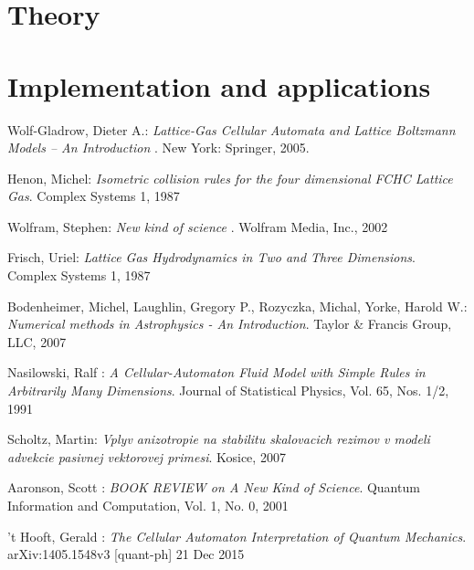 \documentclass[12pt,a4paper,fleqn]{report}
\begin{document}



\tableofcontents


\part{Theory}








%
%
\part{Implementation and applications}

%






%

%

%
% 


\begin{thebibliography}{99}
 
   {\sc Wolf-Gladrow,} Dieter A.:
   \emph{ Lattice-Gas Cellular Automata and Lattice Boltzmann Models -- An Introduction }.
   New York: Springer, 2005.

   {\sc Henon,} Michel:
   \emph{ Isometric collision rules for the four dimensional FCHC Lattice Gas}.
   Complex Systems 1, 1987

   {\sc Wolfram,} Stephen:
   \emph{ New kind of science }.
   Wolfram Media, Inc., 2002

   {\sc Frisch,} Uriel:
   \emph{ Lattice Gas Hydrodynamics in Two and Three Dimensions}.
   Complex Systems 1, 1987

   {\sc Bodenheimer,} Michel, {\sc Laughlin,} Gregory P., {\sc Rozyczka,} Michal, {\sc Yorke,} Harold W.:
   \emph{ Numerical methods in Astrophysics - An Introduction}.
   Taylor \& Francis Group, LLC, 2007


   {\sc Nasilowski,} Ralf :
   \emph{ A Cellular-Automaton Fluid Model with Simple Rules in Arbitrarily Many Dimensions}.
   Journal of Statistical Physics, Vol. 65, Nos. 1/2, 1991

   {\sc Scholtz,} Martin:
   \emph{ Vplyv anizotropie na stabilitu skalovacich
rezimov v modeli advekcie pasivnej
vektorovej primesi}.
   Kosice, 2007
   

   {\sc Aaronson,} Scott :
   \emph{ BOOK REVIEW on A New Kind of Science}.
	Quantum Information and Computation, Vol. 1, No. 0, 2001


   {\sc 't Hooft,} Gerald :
   \emph{ The Cellular Automaton Interpretation of Quantum Mechanics}.
	arXiv:1405.1548v3 [quant-ph] 21 Dec 2015




\end{thebibliography}
\end{document}
